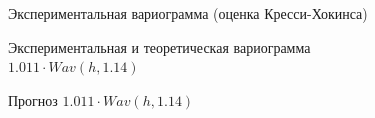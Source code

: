 \begin{figure}[H]
\caption{Экспериментальная вариограмма (оценка Кресси-Хокинса)}
\label{img:robust-variogram}
\end{figure}

\begin{figure}[H]
\caption{Экспериментальная и теоретическая вариограмма $ 1.011 \cdot Wav(h, 1.14) $}
\label{img:auto-class-modeled}
\end{figure}

\begin{figure}[H]
\caption{Прогноз $ 1.011 \cdot Wav(h, 1.14) $}
\label{img:auto-class-20-pred}
\end{figure}

